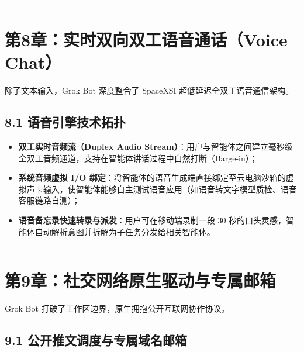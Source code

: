 \documentclass[10.5pt,a4paper,oneside]{report}
\providecommand{\tightlist}{\setlength{\itemsep}{0pt}\setlength{\parskip}{0pt}}
\begin{document}
\begin{center}\rule{0.5\linewidth}{0.5pt}\end{center}

\section{第8章：实时双向双工语音通话（Voice
Chat）}\label{ux7b2c8ux7ae0ux5b9eux65f6ux53ccux5411ux53ccux5de5ux8bedux97f3ux901aux8bddvoice-chat}

除了文本输入，Grok Bot 深度整合了 SpaceXSI 超低延迟全双工语音通信架构。

\subsection{8.1
语音引擎技术拓扑}\label{ux8bedux97f3ux5f15ux64ceux6280ux672fux62d3ux6251}

\begin{itemize}
\tightlist
\item
  \textbf{双工实时音频流（Duplex Audio
  Stream）}：用户与智能体之间建立毫秒级全双工音频通道，支持在智能体讲话过程中自然打断（Barge-in）；
\item
  \textbf{系统音频虚拟 I/O
  绑定}：将智能体的语音生成端直接绑定至云电脑沙箱的虚拟声卡输入，使智能体能够自主测试语音应用（如语音转文字模型质检、语音客服链路自测）；
\item
  \textbf{语音备忘录快速转录与派发}：用户可在移动端录制一段 30
  秒的口头灵感，智能体自动解析意图并拆解为子任务分发给相关智能体。
\end{itemize}

\begin{center}\rule{0.5\linewidth}{0.5pt}\end{center}

\section{第9章：社交网络原生驱动与专属邮箱}\label{ux7b2c9ux7ae0ux793eux4ea4ux7f51ux7edcux539fux751fux9a71ux52a8ux4e0eux4e13ux5c5eux90aeux7bb1}

Grok Bot 打破了工作区边界，原生拥抱公开互联网协作协议。

\subsection{9.1
公开推文调度与专属域名邮箱}\label{ux516cux5f00ux63a8ux6587ux8c03ux5ea6ux4e0eux4e13ux5c5eux57dfux540dux90aeux7bb1}
\end{document}
